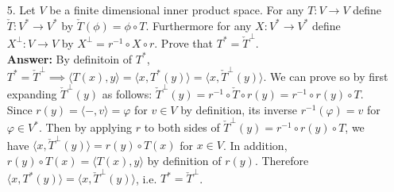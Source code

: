 \documentclass{article}
\begin{document}
\begin{itemize}
\begin{itemize}
	\end{itemize}
	\item [5.] Let $V$ be a finite dimensional inner product space. For any $T:V\rightarrow V$ define $\check{T}:V^*\rightarrow V^*$ by $\check{T}(\phi)=\phi\circ T$. Furthermore for any $X:V^*\rightarrow V^*$ define $X^\perp:V\rightarrow V$ by $X^\perp=r^{-1}\circ X\circ r$. Prove that $T^*=\check{T}^\perp$.\\
	\textbf{Answer: } By definitoin of $T^*$, $T^*=\check{T}^\perp \implies \langle T(x),y\rangle=\langle x,T^*(y)\rangle=\langle x,\check{T}^\perp(y)\rangle$. We can prove so by first expanding $\check{T}^\perp(y)$ as follows: $\check{T}^\perp(y)=r^{-1}\circ\check{T}\circ r(y)=r^{-1}\circ r(y)\circ T$. Since $r(y)=\langle -,v\rangle=\varphi$ for $v\in V$ by definition, its inverse $r^{-1}(\varphi)=v$ for $\varphi\in V^*$. Then by applying $r$ to both sides of $\check{T}^\perp(y)=r^{-1}\circ r(y)\circ T$, we have $\langle x,\check{T}^\perp(y)\rangle=r(y)\circ T(x)$ for $x\in V$. In addition, $r(y)\circ T(x)=\langle T(x),y\rangle$ by definition of $r(y)$. Therefore $\langle x,T^*(y)\rangle=\langle x,\check{T}^\perp(y)\rangle$, i.e. $T^*=\check{T}^\perp$.\\
\end{itemize}
\end{document}
